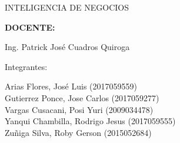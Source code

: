 \documentclass[12pt,letterpaper]{article}
\begin{document}
\begin{titlepage}
\begin{center}
\vspace*{0.1in}
\begin{large}
INTELIGENCIA DE NEGOCIOS\\
\end{large}

\vspace*{0.3in}
\begin{Large}
\textbf{DOCENTE:} \\
\end{Large}

\vspace*{0.1in}
\begin{large}
Ing. Patrick José Cuadros Quiroga\\
\end{large}

\vspace*{0.2in}
\vspace*{0.1in}
\begin{large}
Integrantes: \\
\begin{flushleft}
Arias Flores, José Luis 			\hfill	(2017059559) \\
Gutierrez Ponce, Jose Carlos  		\hfill	(2017059277) \\
Vargas Cusacani, Posi Yuri  		\hfill	(2009034478) \\
Yanqui Chambilla, Rodrigo Jesus  	\hfill	(2017059555) \\
Zuñiga Silva, Roby Gerson       	\hfill	(2015052684) \\

\end{flushleft}
\end{large}
\end{center}

\end{titlepage}




\end{document}

